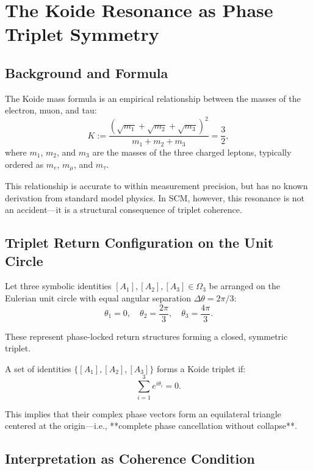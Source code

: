 \chapter{The Koide Resonance as Phase Triplet Symmetry} \label{chapter:koide-resonance}

\section{Background and Formula}

The Koide mass formula is an empirical relationship between the masses of the electron, muon, and tau:
\begin{equation}
K := \frac{(\sqrt{m_1} + \sqrt{m_2} + \sqrt{m_3})^2}{m_1 + m_2 + m_3} = \frac{3}{2},
\end{equation}
where $m_1$, $m_2$, and $m_3$ are the masses of the three charged leptons, typically ordered as $m_e$, $m_\mu$, and $m_\tau$.

This relationship is accurate to within measurement precision, but has no known derivation from standard model physics. In SCM, however, this resonance is not an accident—it is a structural consequence of triplet coherence.

\section{Triplet Return Configuration on the Unit Circle}

Let three symbolic identities $[A_1], [A_2], [A_3] \in \Omega_3$ be arranged on the Eulerian unit circle with equal angular separation $\Delta \theta = 2\pi / 3$:
\[
\theta_1 = 0, \quad \theta_2 = \frac{2\pi}{3}, \quad \theta_3 = \frac{4\pi}{3}.
\]

These represent phase-locked return structures forming a closed, symmetric triplet.

\begin{definition}
A set of identities $\{[A_1], [A_2], [A_3]\}$ forms a Koide triplet if:
\[
\sum_{i=1}^3 e^{i\theta_i} = 0.
\]
\end{definition}

\noindent This implies that their complex phase vectors form an equilateral triangle centered at the origin—i.e., **complete phase cancellation without collapse**.

\section{Interpretation as Coherence Condition}

